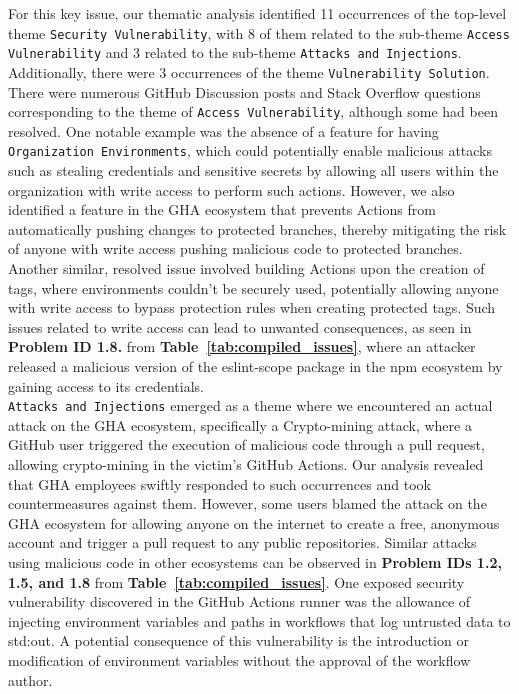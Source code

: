 \documentclass[conference]{IEEEtran}
\begin{document}
	For this key issue, our thematic analysis identified 11 occurrences of the top-level theme \texttt{Security Vulnerability}, with 8 of them related to the sub-theme \texttt{Access Vulnerability} and 3 related to the sub-theme \texttt{Attacks and Injections}. Additionally, there were 3 occurrences of the theme \texttt{Vulnerability Solution}.\\
	There were numerous GitHub Discussion posts and Stack Overflow questions corresponding to the theme of \texttt{Access Vulnerability}, although some had been resolved. One notable example was the absence of a feature for having \texttt{Organization Environments}, which could potentially enable malicious attacks such as stealing credentials and sensitive secrets by allowing all users within the organization with write access to perform such actions. However, we also identified a feature in the GHA ecosystem that prevents Actions from automatically pushing changes to protected branches, thereby mitigating the risk of anyone with write access pushing malicious code to protected branches. Another similar, resolved issue involved building Actions upon the creation of tags, where environments couldn't be securely used, potentially allowing anyone with write access to bypass protection rules when creating protected tags. Such issues related to write access can lead to unwanted consequences, as seen in \textbf{Problem ID 1.8.} from \textbf{Table~\ref{tab:compiled_issues}}, where an attacker released a malicious version of the eslint-scope package in the npm ecosystem by gaining access to its credentials.\\
	\texttt{Attacks and Injections} emerged as a theme where we encountered an actual attack on the GHA ecosystem, specifically a Crypto-mining attack, where a GitHub user triggered the execution of malicious code through a pull request, allowing crypto-mining in the victim's GitHub Actions. Our analysis revealed that GHA employees swiftly responded to such occurrences and took countermeasures against them. However, some users blamed the attack on the GHA ecosystem for allowing anyone on the internet to create a free, anonymous account and trigger a pull request to any public repositories. Similar attacks using malicious code in other ecosystems can be observed in \textbf{Problem IDs 1.2, 1.5, and 1.8} from \textbf{Table~\ref{tab:compiled_issues}}. One exposed security vulnerability discovered in the GitHub Actions runner was the allowance of injecting environment variables and paths in workflows that log untrusted data to std:out. A potential consequence of this vulnerability is the introduction or modification of environment variables without the approval of the workflow author.
\end{document}
